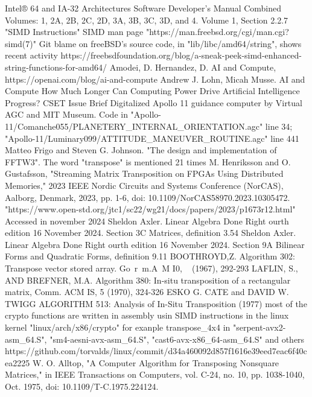 \documentclass[conference]{IEEEtran}
\begin{document}
\begin{thebibliography}{00}
 Intel® 64 and IA-32 Architectures Software Developer’s Manual Combined Volumes: 1, 2A, 2B, 2C, 2D, 3A, 3B, 3C, 3D, and 4. Volume 1, Section 2.2.7 "SIMD Instructions"
 SIMD man page "https://man.freebsd.org/cgi/man.cgi?simd(7)"
 Git blame on freeBSD's source code, in "lib/libc/amd64/string", shows recent activity
 https://freebsdfoundation.org/blog/a-sneak-peek-simd-enhanced-string-functions-for-amd64/
 Amodei, D. Hernandez, D. AI and Compute, https://openai.com/blog/ai-and-compute
 Andrew J. Lohn, Micah Musse. AI and Compute How Much Longer Can Computing Power Drive Artificial Intelligence Progress? CSET Issue Brief
 Digitalized Apollo 11 guidance computer by Virtual AGC and MIT Museum. Code in "Apollo-11/Comanche055/PLANETERY\_INTERNAL\_ORIENTATION.agc" line 34; "Apollo-11/Luminary099/ATTITUDE\_MANEUVER\_ROUTINE.agc" line 441
 Matteo Frigo and Steven G. Johnson. "The design and implementation of FFTW3". The word "transpose" is mentioned 21 times
 M. Henriksson and O. Gustafsson, "Streaming Matrix Transposition on FPGAs Using Distributed Memories," 2023 IEEE Nordic Circuits and Systems Conference (NorCAS), Aalborg, Denmark, 2023, pp. 1-6, doi: 10.1109/NorCAS58970.2023.10305472.
 "https://www.open-std.org/jtc1/sc22/wg21/docs/papers/2023/p1673r12.html" Accessed in november 2024
 Sheldon Axler. Linear Algebra Done Right ourth edition
16 November 2024. Section 3C Matrices, definition 3.54
 Sheldon Axler. Linear Algebra Done Right ourth edition
16 November 2024. Section 9A Bilinear Forms and Quadratic Forms, definition 9.11
 BOOTHROYD,Z. Algorithm 302: Transpose vector stored array. Go~r~m.A~M I0, ~ (1967),
292-293
 LAFLIN, S., AND BREFNER, M.A. Algorithm 380: In-situ transposition of a rectangular
matrix, Comm. ACM IS, 5 (1970), 324-326
 ESKO G. CATE and DAVID W. TWIGG ALGORITHM 513: Analysis of In-Situ Transposition (1977)
 most of the crypto functions are written in assembly usin SIMD instructions in the
linux kernel "linux/arch/x86/crypto" for exanple transpose\_4x4 in "serpent-avx2-asm\_64.S", "sm4-aesni-avx-asm\_64.S",
"cast6-avx-x86\_64-asm\_64.S" and others
 https://github.com/torvalds/linux/commit/d34a460092d857f1616e39eed7eac6f40cea2225
 W. O. Alltop, "A Computer Algorithm for Transposing Nonsquare Matrices," in IEEE Transactions on Computers, vol. C-24, no. 10, pp. 1038-1040, Oct. 1975, doi: 10.1109/T-C.1975.224124.

\end{thebibliography}
\end{document}
